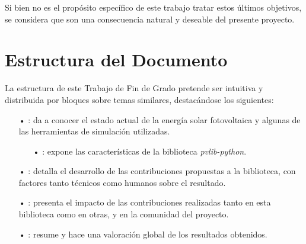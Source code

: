 Si bien no es el propósito específico de este trabajo tratar estos últimos objetivos, se considera que son una consecuencia natural y deseable del presente proyecto.


\section{Estructura del Documento} \label{sct:intro_estructura}

La estructura de este Trabajo de Fin de Grado pretende ser intuitiva y distribuida por bloques sobre temas similares, destacándose los siguientes:

\begin{itemize}

    \item[•] : da a conocer el estado actual de la energía solar fotovoltaica y algunas de las herramientas de simulación utilizadas.

        \begin{itemize}
            \item[•] : expone las características de la biblioteca \textit{pvlib-python}.
        \end{itemize}

    \item[•] : detalla el desarrollo de las contribuciones propuestas a la biblioteca, con factores tanto técnicos como humanos sobre el resultado.

    \item[•] : presenta el impacto de las contribuciones realizadas tanto en esta biblioteca como en otras, y en la comunidad del proyecto.

    \item[•] : resume y hace una valoración global de los resultados obtenidos.


\end{itemize}


